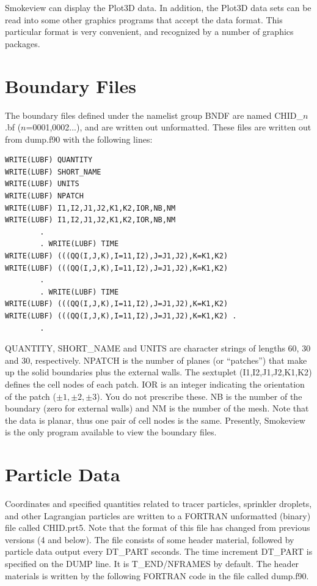 \documentclass[11pt]{book}
\begin{document}
Smokeview can display the Plot3D data. In addition, the Plot3D data sets can be read into some other graphics programs that accept the data format. This particular format is very convenient, and recognized by a number of graphics packages.


\section{Boundary Files}
\label{out:BNDF}

The boundary files defined under the namelist group {\ct BNDF} are named {\ct CHID\_$n$.bf} ($n$=0001,0002...), and are written out unformatted. These files are written out from {\ct dump.f90} with the following lines:
\begin{lstlisting}
WRITE(LUBF) QUANTITY
WRITE(LUBF) SHORT_NAME
WRITE(LUBF) UNITS
WRITE(LUBF) NPATCH
WRITE(LUBF) I1,I2,J1,J2,K1,K2,IOR,NB,NM
WRITE(LUBF) I1,I2,J1,J2,K1,K2,IOR,NB,NM
        .
        . WRITE(LUBF) TIME
WRITE(LUBF) (((QQ(I,J,K),I=11,I2),J=J1,J2),K=K1,K2)
WRITE(LUBF) (((QQ(I,J,K),I=11,I2),J=J1,J2),K=K1,K2)
        .
        . WRITE(LUBF) TIME
WRITE(LUBF) (((QQ(I,J,K),I=11,I2),J=J1,J2),K=K1,K2)
WRITE(LUBF) (((QQ(I,J,K),I=11,I2),J=J1,J2),K=K1,K2) .
        .
\end{lstlisting}
{\ct QUANTITY}, {\ct SHORT\_NAME} and {\ct UNITS} are character strings of lengths 60, 30 and 30, respectively. {\ct NPATCH} is the number of planes (or ``patches'') that make up the solid boundaries plus the external walls. The sextuplet ({\ct I1,I2,J1,J2,K1,K2}) defines the cell nodes of each patch. {\ct IOR} is an integer indicating the orientation of the patch ($\pm 1,\pm 2,\pm 3$). You do not prescribe these. {\ct NB} is the number of the boundary (zero for external walls) and {\ct NM} is the number of the mesh.  Note that the data is planar, thus one pair of cell nodes is the same. Presently, Smokeview is the
only program available to view the boundary files.

\section{Particle Data}
\label{out:PART}

Coordinates and specified quantities related to tracer particles, sprinkler droplets, and other Lagrangian particles are written
to a FORTRAN unformatted (binary) file called {\ct CHID.prt5}.
Note that the format of this file has changed from previous versions (4 and below).
The file consists of some header material, followed by particle data output every
{\ct DT\_PART} seconds. The time increment {\ct DT\_PART} is specified on the
{\ct DUMP} line. It is {\ct T\_END/NFRAMES} by default.
The header materials is written by the following FORTRAN code in the file called {\ct dump.f90}.
\end{document}

